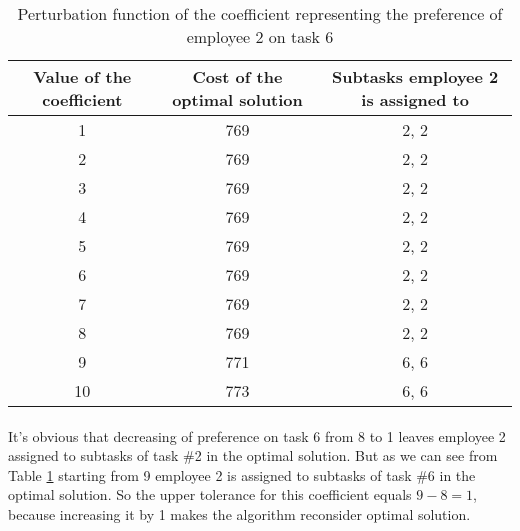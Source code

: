 \begin{enumerate}[(a)]
\begin{table}[H]
	\centering
	\caption{Perturbation function of the coefficient representing the preference of employee 2 on task 6}
	\begin{tabular}{|c|c|c|}\hline
	Value of the coefficient & Cost of the optimal solution & Subtasks employee 2 is assigned to \\ \hline
1 & 769 & 2, 2 \\
2 & 769 & 2, 2 \\
3 & 769 & 2, 2 \\
4 & 769 & 2, 2 \\
5 & 769 & 2, 2 \\
6 & 769 & 2, 2 \\
7 & 769 & 2, 2 \\
8 & 769 & 2, 2 \\
9 & 771 & 6, 6 \\
10 & 773 & 6, 6 \\
	\hline
	\end{tabular}
	\label{tol-3-h}
\end{table}

	\paragraph{}
	It's obvious that decreasing of preference on task 6 from 8 to 1 leaves employee 2 assigned to subtasks of task \#2 in the optimal solution. But as we can see from Table \ref{tol-3-h} starting from 9 employee 2 is assigned to subtasks of task \#6 in the optimal solution. So the upper tolerance for this coefficient equals $9 - 8 = 1$, because increasing it by 1 makes the algorithm reconsider optimal solution.

\end{enumerate}

